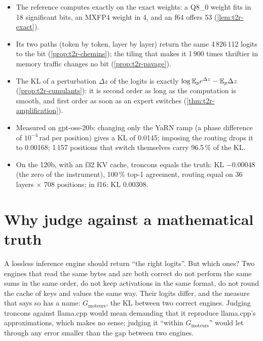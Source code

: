 \begin{enbref}
\begin{itemize}
\item The reference computes exactly on the exact weights: a Q8\_0 weight fits in 18 significant bits, an MXFP4 weight in 4, and an f64 offers 53 (\cref{lem:t2r-exact}).
\item Its two paths (token by token, layer by layer) return the same 4\,826\,112 logits to the bit (\cref{prop:t2r-chemins}); the tiling that makes it 1\,900 times thriftier in memory traffic changes no bit (\cref{prop:t2r-pavage}).
\item The KL of a perturbation $\Delta z$ of the logits is exactly $\log \mathbb{E}_p e^{\Delta z} - \mathbb{E}_p \Delta z$ (\cref{prop:t2r-cumulants}): it is second order as long as the computation is smooth, and first order as soon as an expert switches (\cref{thm:t2r-amplification}).
\item Measured on gpt-oss-20b: changing only the YaRN ramp (a phase difference of $10^{-4}$\,rad per position) gives a KL of 0.0145; imposing the routing drops it to 0.00168; 1\,157 positions that switch themselves carry 96.5\,\% of the KL.
\item On the 120b, with an f32 KV cache, troncons equals the truth: KL $-0.00048$ (the zero of the instrument), 100\,\% top-1 agreement, routing equal on 36 layers $\times$ 708 positions; in f16: KL 0.00308.
\end{itemize}
\end{enbref}

\section{Why judge against a mathematical truth}\label{sec:t2r-pourquoi}

A lossless inference engine should return \enquote{the right logits}. But which ones? Two engines that read the same bytes and are both correct do not perform the same sums in the same order, do not keep activations in the same format, do not round the cache of keys and values the same way. Their logits differ, and the measure that says so has a name: $G_{\text{moteurs}}$, the KL between two correct engines. Judging troncons against llama.cpp would mean demanding that it reproduce llama.cpp's approximations, which makes no sense; judging it \enquote{within $G_{\text{moteurs}}$} would let through any error smaller than the gap between two engines.

